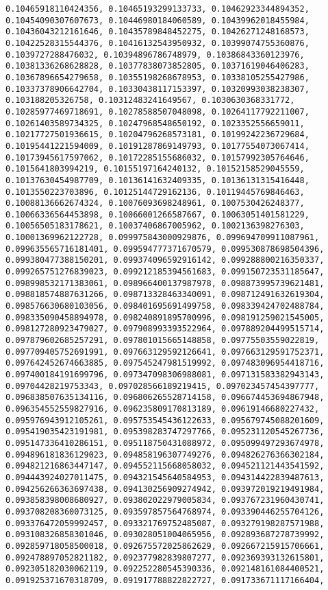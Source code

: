 \documentclass[11pt]{article}
\begin{document}
\begin{Verbatim}[commandchars=\\\{\}]
0.10465918110424356, 0.10465193299133733, 0.10462923344894352, 0.10454090307607673, 0.10446980184060589, 0.10439962018455984, 0.10436043212161646, 0.10435789848452275, 0.10426271248168573, 0.10422528315544376, 0.10416132543950932, 0.10399074755360876, 0.1039727288476032, 0.10394896786748979, 0.10386843360123976, 0.10381336268628828, 0.10377838073852805, 0.10371619046406283, 0.10367896654279658, 0.10355198268678953, 0.10338105255427986, 0.10337378906642704, 0.10330438117153397, 0.10320993038238307, 0.103188205326758, 0.10312483241649567, 0.1030630368331772, 0.10285977469718691, 0.10278588507048098, 0.10264117792211007, 0.10261403589734325, 0.10247968548650192, 0.1023352556659011, 0.10217727501936615, 0.10204796268573181, 0.10199242236729684, 0.10195441221594009, 0.10191287869149793, 0.10177554073067414, 0.10173945617597062, 0.10172285155686032, 0.10157992305764646, 0.1015641803994219, 0.10155197164240132, 0.10152158529045559, 0.10137630454987709, 0.10136141632409335, 0.10136131315416448, 0.1013550223703896, 0.10125144729162136, 0.10119445769846463, 0.10088136662674324, 0.10076093698248961, 0.1007530426248377, 0.10066336564453898, 0.10066001266587667, 0.10063051401581229, 0.10056505183178621, 0.10037406867005962, 0.1002136398276303, 0.10001369962122728, 0.099975843000929876, 0.099694709911087961, 0.099635565716181401, 0.099594777371670579, 0.099530878698504396, 0.099380477388150201, 0.099374096592916142, 0.099288800216350337, 0.099265751276839023, 0.099212185394561683, 0.099150723531185647, 0.098998532171383061, 0.098966400137987978, 0.098873995739621481, 0.098818574887631266, 0.098713328463340091, 0.098712491632619304, 0.098576630680103056, 0.098401695691499758, 0.098339424702488784, 0.098335090458894978, 0.098240891895700996, 0.098191259021545005, 0.098127280923479027, 0.097908993393522964, 0.097889204499515714, 0.097879602685257291, 0.097801015665148858, 0.09775503559022819, 0.097709405752691991, 0.097663129592126641, 0.097663129591752371, 0.097642452674663885, 0.097545247981519992, 0.097483096954418716, 0.097400184191699796, 0.097347098306988081, 0.097131583382943143, 0.09704428219753343, 0.097028566189219415, 0.097023457454397777, 0.096838507635134116, 0.096806265528714158, 0.096674453694867948, 0.096354552559827916, 0.096235809170813189, 0.09619146680227432, 0.095976943912105261, 0.095753545436122633, 0.095679745088201609, 0.095419035423191981, 0.095398283747297766, 0.095231120545267736, 0.095147336410286151, 0.095118750431088972, 0.095099497293674978, 0.094896181836129023, 0.094858196307749276, 0.094826276366302184, 0.094821216863447147, 0.094552115668058032, 0.094521121443541592, 0.094443924027011475, 0.094321545640584953, 0.094314422839487613, 0.094256266363697438, 0.094130256909274942, 0.093972019219491984, 0.093858398008680927, 0.093802022979005834, 0.093767231960430741, 0.093708208360073125, 0.093597857564768974, 0.093390446255704126, 0.093376472059992457, 0.093321769752485087, 0.093279198287571988, 0.093108326858301046, 0.093028051004065956, 0.092893687278739992, 0.092859718058500018, 0.092675572025862629, 0.092667215915706661, 0.092478897052821182, 0.092377982839807277, 0.092369393132615801, 0.092305182030062119, 0.092252280545390336, 0.092148161084400521, 0.091925371670318709, 0.091917788822822727, 0.091733671117166404, 
\end{Verbatim}
\end{document}
